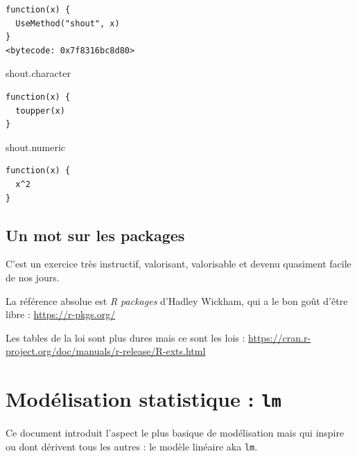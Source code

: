 \documentclass[
  letterpaper,
  DIV=11,
  numbers=noendperiod]{scrreprt}
\newenvironment{Shaded}{\begin{snugshade}}{\end{snugshade}}
\newcommand{\NormalTok}[1]{\textcolor[rgb]{0.00,0.23,0.31}{#1}}
\begin{document}
\begin{verbatim}
function(x) {
  UseMethod("shout", x)
}
<bytecode: 0x7f8316bc8d80>
\end{verbatim}

\begin{Shaded}
\begin{Highlighting}[]
\NormalTok{shout.character}
\end{Highlighting}
\end{Shaded}

\begin{verbatim}
function(x) {
  toupper(x)
}
\end{verbatim}

\begin{Shaded}
\begin{Highlighting}[]
\NormalTok{shout.numeric}
\end{Highlighting}
\end{Shaded}

\begin{verbatim}
function(x) {
  x^2
}
\end{verbatim}

\hypertarget{un-mot-sur-les-packages-1}{%
\section{Un mot sur les packages}\label{un-mot-sur-les-packages-1}}

C'est un exercice très instructif, valorisant, valorisable et devenu
quasiment facile de nos jours.

La référence absolue est \emph{R packages} d'Hadley Wickham, qui a le
bon goût d'être libre : \href{}{https://r-pkgs.org/}

Les tables de la loi sont plus dures mais ce sont les lois :
\href{Writing\%20R\%20extensions\%20--\%20official\%20R\%20documentation}{https://cran.r-project.org/doc/manuals/r-release/R-exts.html}


\hypertarget{moduxe9lisation-statistique-lm}{%
\chapter{\texorpdfstring{Modélisation statistique :
\texttt{lm}}{Modélisation statistique : lm}}\label{moduxe9lisation-statistique-lm}}

Ce document introduit l'aspect le plus basique de modélisation mais qui
inspire ou dont dérivent tous les autres : le modèle linéaire aka
\texttt{lm}.
\end{document}
